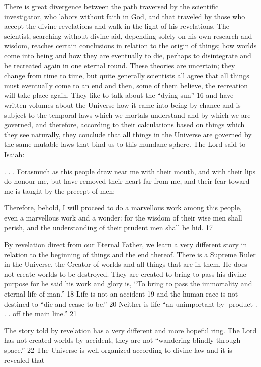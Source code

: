 There is great divergence between the path traversed by the scientific investigator, who
labors without faith in God, and that traveled by those who accept the divine revelations and
walk in the light of his revelations. The scientist, searching without divine aid, depending
solely on his own research and wisdom, reaches certain conclusions in relation to the origin
of things; how worlds come into being and how they are eventually to die, perhaps to
disintegrate and be recreated again in one eternal round. These theories are uncertain; they
change from time to time, but quite generally scientists all agree that all things must
eventually come to an end and then, some of them believe, the recreation will take place
again. They like to talk about the ``dying sun'' 16 and have written volumes about the
Universe how it came into being by chance and is subject to the temporal laws which we
mortals understand and by which we are governed, and therefore, according to their
calculations based on things which they see naturally, they conclude that all things in the
Universe are governed by the same mutable laws that bind us to this mundane sphere. The
Lord said to Isaiah:

. . . Forasmuch as this people draw near me with their mouth, and with their lips do honour
me, but have removed their heart far from me, and their fear toward me is taught by the
precept of men:

Therefore, behold, I will proceed to do a marvellous work among this people, even a
marvellous work and a wonder: for the wisdom of their wise men shall perish, and the
understanding of their prudent men shall be hid. 17

By revelation direct from our Eternal Father, we learn a very different story in relation to the
beginning of things and the end thereof. There is a Supreme Ruler in the Universe, the
Creator of worlds and all things that are in them. He does not create worlds to be destroyed.
They are created to bring to pass his divine purpose for he said his work and glory is, ``To
bring to pass the immortality and eternal life of man.'' 18 Life is not an accident 19 and the
human race is not destined to ``die and cease to be.'' 20 Neither is life ``an unimportant by-
product . . . off the main line.'' 21

The story told by revelation has a very different and more hopeful ring. The Lord has not
created worlds by accident, they are not ``wandering blindly through space.'' 22 The Universe
is well organized according to divine law and it is revealed that—

